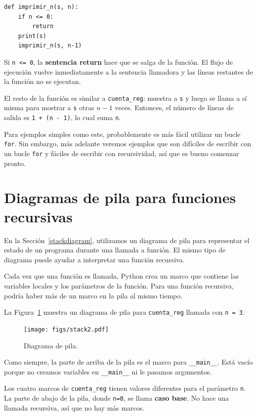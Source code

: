 \documentclass[10pt]{book}
\begin{document}
\begin{verbatim}
def imprimir_n(s, n):
    if n <= 0:
        return
    print(s)
    imprimir_n(s, n-1)
\end{verbatim}
%
Si {\tt n <= 0}, la {\bf sentencia return} hace que se salga de la función.  El
flujo de ejecución vuelve inmediatamente a la sentencia llamadora y las líneas restantes
de la función no se ejecutan.

El resto de la función es similar a {\tt cuenta\_reg}: muestra a
{\tt s} y luego se llama a sí misma para mostrar a {\tt s} otras $n-1$
veces.  Entonces, el número de líneas de salida es {\tt 1 + (n - 1)}, lo cual
suma {\tt n}.

Para ejemplos simples como este, probablemente es más fácil utilizar un bucle {\tt
for}.  Sin embargo, más adelante veremos ejemplos que son difíciles de escribir
con un bucle {\tt for} y fáciles de escribir con recursividad, así que es
bueno comenzar pronto.


\section{Diagramas de pila para funciones recursivas}
\label{recursive.stack}

En la Sección~\ref{stackdiagram}, utilizamos un diagrama de pila para representar
el estado de un programa durante una llamada a función.  El mismo tipo de
diagrama puede ayudar a interpretar una función recursiva.

Cada vez que una función es llamada, Python crea un
marco que contiene las variables locales y los parámetros de la función.
Para una función recursiva, podría haber más de un marco en la
pila al mismo tiempo.

La Figura~\ref{fig.stack2} muestra un diagrama de pila para {\tt cuenta\_reg} llamada con
{\tt n = 3}.

\begin{figure}
\centerline
{\texttt{[image: figs/stack2.pdf]}}
\caption{Diagrama de pila.}
\label{fig.stack2}
\end{figure}


Como siempre, la parte de arriba de la pila es el marco para \verb"__main__".
Está vacío porque no creamos variables en
\verb"__main__" ni le pasamos argumentos.

Los cuatro marcos de {\tt cuenta\_reg} tienen valores diferentes para el
parámetro {\tt n}.  La parte de abajo de la pila, donde {\tt n=0}, se
llama {\bf caso base}.  No hace una llamada recursiva, así que
no hay más marcos.
\end{document}
